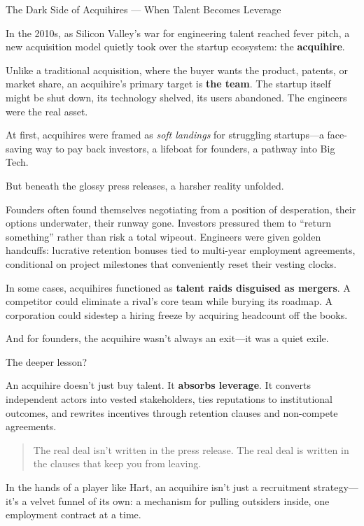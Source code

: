 \begin{HistoricalSidebar}{The Dark Side of Acquihires --- When Talent Becomes Leverage}

  In the 2010s, as Silicon Valley’s war for engineering talent reached fever pitch, a new acquisition model quietly took over the startup ecosystem: the \textbf{acquihire}.

  \medskip
  
  Unlike a traditional acquisition, where the buyer wants the product, patents, or market share, an acquihire’s primary target is \textbf{the team}. The startup itself might be shut down, its technology shelved, its users abandoned. The engineers were the real asset.

  \medskip
  
  At first, acquihires were framed as \textit{soft landings} for struggling startups—a face-saving way to pay back investors, a lifeboat for founders, a pathway into Big Tech.

  \medskip
  
  But beneath the glossy press releases, a harsher reality unfolded.

  \medskip
  
  Founders often found themselves negotiating from a position of desperation, their options underwater, their runway gone. Investors pressured them to “return something” rather than risk a total wipeout. Engineers were given golden handcuffs: lucrative retention bonuses tied to multi-year employment agreements, conditional on project milestones that conveniently reset their vesting clocks.

  \medskip
  
  In some cases, acquihires functioned as \textbf{talent raids disguised as mergers}. A competitor could eliminate a rival’s core team while burying its roadmap. A corporation could sidestep a hiring freeze by acquiring headcount off the books.

  \medskip
  
  And for founders, the acquihire wasn’t always an exit—it was a quiet exile.
  
  \medskip
  
  The deeper lesson?

  \medskip
  
  An acquihire doesn’t just buy talent. It \textbf{absorbs leverage}. It converts independent actors into vested stakeholders, ties reputations to institutional outcomes, and rewrites incentives through retention clauses and non-compete agreements.
  
  \begin{quote}
  The real deal isn’t written in the press release.  
  The real deal is written in the clauses that keep you from leaving.
  \end{quote}
  
  In the hands of a player like Hart, an acquihire isn’t just a recruitment strategy—it’s a velvet funnel of its own:  
  a mechanism for pulling outsiders inside, one employment contract at a time.
\end{HistoricalSidebar}

